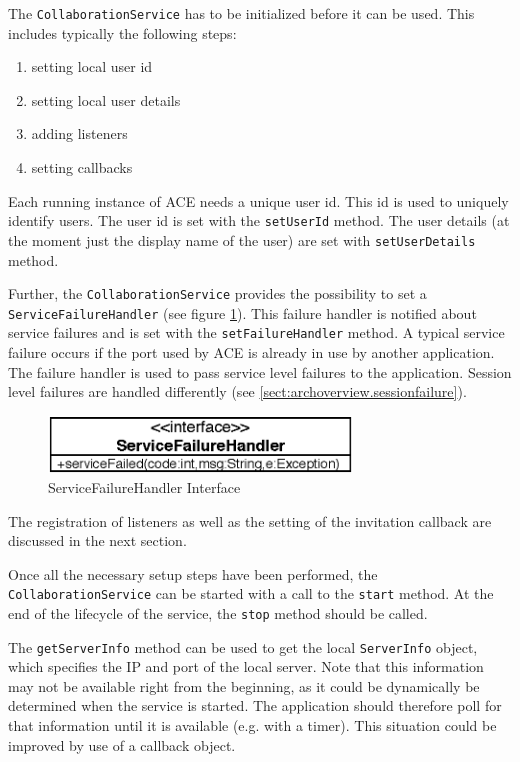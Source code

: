 The \texttt{Collaboration\-Service} has to be initialized before it can
be used. This includes typically the following steps:

\begin{enumerate}
 \item setting local user id
 \item setting local user details
 \item adding listeners
 \item setting callbacks
\end{enumerate}

Each running instance of ACE needs a unique user id. This id is used to uniquely
identify users. The user id is set with the \texttt{set\-User\-Id} method. The
user details (at the moment just the display name of the user) are set with
\texttt{set\-User\-Details} method.

Further, the \texttt{Collaboration\-Service} provides the possibility to set a
\texttt{Service\-Failure\-Handler} 
(see figure \ref{fig:archoverview.servicefailurehandler}). 
This failure handler is notified about 
service failures and is set with the \texttt{set\-Failure\-Handler} method. 
A typical service failure occurs if the port used by
ACE is already in use by another application. The failure handler is used
to pass service level failures to the application. Session level failures
are handled differently (see \ref{sect:archoverview.sessionfailure}). 

\begin{figure}[H]
 \centering
 \includegraphics[width=8.08cm,height=1.52cm]{../images/finalreport/architecture_servicefailurehandler_uml.eps}
 \caption{ServiceFailureHandler Interface}
 \label{fig:archoverview.servicefailurehandler}
\end{figure}


The registration of listeners as well as the setting of the invitation 
callback are discussed in the next section.

Once all the necessary setup steps have been performed, the
\texttt{Collaboration\-Service} can be started with a call to the
\texttt{start} method. At the end of the lifecycle of the
service, the \texttt{stop} method should be called.

The \texttt{get\-Server\-Info} method can be used to get the local 
\texttt{Server\-Info} object, which specifies the IP and port of the
local server. Note that this information may not be available right
from the beginning, as it could be dynamically be determined when the
service is started. The application should therefore poll for that information
until it is available (e.g. with a timer). This situation could be improved
by use of a callback object.


